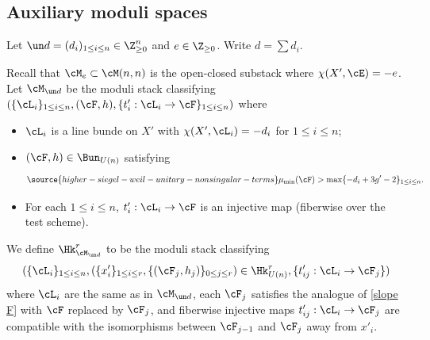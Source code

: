 \subsection{Auxiliary moduli spaces}
Let $\un d=(d_{i})_{1\le i\le n}\in \Z^{n}_{\ge0}$ and $e\in \Z_{\ge0}$. Write $d=\sum d_{i}$.

Recall that $\cM_{e}\subset \cM(n,n)$ is the open-closed substack where $\chi(X',\cE)=-e$. Let $\cM_{\un d}$ be the moduli stack classifying $(\{\cL_{i}\}_{1\le i\le n}, (\cF,h),\{t'_{i}:\cL_{i}\to \cF\}_{1\le i\le n})$ where
\begin{itemize}
\item $\cL_{i}$ is a line bunde on $X'$ with $\chi(X',\cL_{i})=-d_{i}$ for $1\le i\le n$;
\item $(\cF,h)\in \Bun_{U(n)}$ satisfying
\begin{equation}\label{slope F}
\source{higher-siegel-weil-unitary-nonsingular-terms}
\mu_{\min}(\cF)>\max\{-d_{i}+3g'-2\}_{1\le i\le n}.
\end{equation}
\item For each $1\le i\le n$, $t'_{i}: \cL_{i}\to \cF$ is an injective map (fiberwise over the test scheme).
\end{itemize}
We define $\Hk^{r}_{\cM_{\un d}}$ to be the moduli stack classifying
\begin{equation*}
(\{\cL_{i}\}_{1\le i\le n}, (\{x'_{i}\}_{1\le i\le r}, \{(\cF_{j},h_{j})\}_{0\le j\le r})\in \Hk^{r}_{U(n)},\{t'_{ij}:\cL_{i}\to \cF_{j}\})
\end{equation*}
where  $\cL_{i}$ are the same  as in $\cM_{\un d}$, each $\cF_{j}$ satisfies the analogue of \eqref{slope F} with $\cF$ replaced by $\cF_{j}$, and fiberwise injective maps $t'_{ij}:\cL_{i}\to \cF_{j}$ are compatible with the isomorphisms between $\cF_{j-1}$ and $\cF_{j}$ away from $x'_{i}$.

